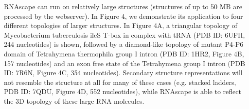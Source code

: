 RNAscape can run on relatively large structures (structures of up to 50 MB are processed by the webserver). In Figure 4, we demonstrate its application to four different topologies of larger structures. In Figure 4A, a triangular topology of Mycobacterium tuberculosis ileS T-box in complex with tRNA (PDB ID: 6UFH, 244 nucleotides) is shown, followed by a diamond-like topology of mutant P4-P6 domain of Tetrahymena thermophila group I intron (PDB ID: 1HR2, Figure 4B, 157 nucleotides) and an exon free state of the Tetrahymena group I intron (PDB ID: 7R6N, Figure 4C, 354 nucleotides). Secondary structure representations will not resemble the structure at all for many of these cases (e.g. stacked ladders, PDB ID: 7QDU, Figure 4D, 552 nucleotides), while RNAscape is able to reflect the 3D topology of these large RNA molecules.
\begin{center}
    \begin{figure}

\end{figure}
\end{center}
